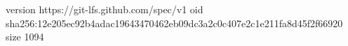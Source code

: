 version https://git-lfs.github.com/spec/v1
oid sha256:12e205ec92b4adac19643470462eb09dc3a2c0c407e2c1e211fa8d45f2f66920
size 1094
